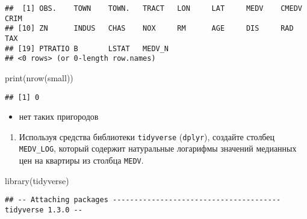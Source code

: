 \documentclass[
]{article}
\newenvironment{Shaded}{\begin{snugshade}}{\end{snugshade}}
\newcommand{\DecValTok}[1]{\textcolor[rgb]{0.00,0.00,0.81}{#1}}
\newcommand{\FunctionTok}[1]{\textcolor[rgb]{0.00,0.00,0.00}{#1}}
\newcommand{\NormalTok}[1]{#1}
\newcommand{\OtherTok}[1]{\textcolor[rgb]{0.56,0.35,0.01}{#1}}
\newcommand{\SpecialCharTok}[1]{\textcolor[rgb]{0.00,0.00,0.00}{#1}}
\providecommand{\tightlist}{%
  \setlength{\itemsep}{0pt}\setlength{\parskip}{0pt}}
\begin{document}
\begin{Shaded}
\end{Shaded}

\begin{verbatim}
##  [1] OBS.    TOWN    TOWN.   TRACT   LON     LAT     MEDV    CMEDV   CRIM   
## [10] ZN      INDUS   CHAS    NOX     RM      AGE     DIS     RAD     TAX    
## [19] PTRATIO B       LSTAT   MEDV_N 
## <0 rows> (or 0-length row.names)
\end{verbatim}

\begin{Shaded}
\begin{Highlighting}[]
\FunctionTok{print}\NormalTok{(}\FunctionTok{nrow}\NormalTok{(small))}
\end{Highlighting}
\end{Shaded}

\begin{verbatim}
## [1] 0
\end{verbatim}

\begin{itemize}
\tightlist
\item
  нет таких пригородов
\end{itemize}

\begin{enumerate}
\def\labelenumi{\arabic{enumi}.}
\setcounter{enumi}{5}
\tightlist
\item
  Используя средства библиотеки \texttt{tidyverse} (\texttt{dplyr}),
  создайте столбец \texttt{MEDV\_LOG}, который содержит натуральные
  логарифмы значений медианных цен на квартиры из столбца \texttt{MEDV}.
\end{enumerate}

\begin{Shaded}
\begin{Highlighting}[]
\FunctionTok{library}\NormalTok{(tidyverse)}
\end{Highlighting}
\end{Shaded}

\begin{verbatim}
## -- Attaching packages --------------------------------------- tidyverse 1.3.0 --
\end{verbatim}
\end{document}
